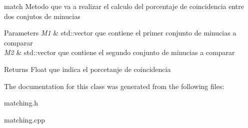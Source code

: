 match Metodo que va a realizar el calculo del porcentaje de coincidencia entre dos conjutos de minucias 


\begin{DoxyParams}{Parameters}
{\em M1} & std\+::vector que contiene el primer conjunto de minucias a comparar \\
\hline
{\em M2} & std\+::vector que contiene el segundo conjunto de minucias a comparar \\
\hline
\end{DoxyParams}
\begin{DoxyReturn}{Returns}
Float que indica el porcetanje de coincidencia 
\end{DoxyReturn}


The documentation for this class was generated from the following files\+:\begin{DoxyCompactItemize}
\item 
matching.\+h\item 
matching.\+cpp\end{DoxyCompactItemize}
